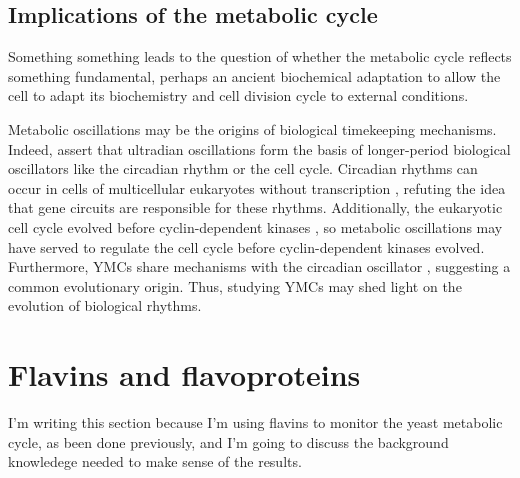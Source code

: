 \subsection{Implications of the metabolic cycle}
\label{subsec:intro-ymc-implications}



Something something leads to the question of whether the metabolic cycle reflects something fundamental, perhaps an ancient biochemical adaptation to allow the cell to adapt its biochemistry and cell division cycle to external conditions.

Metabolic oscillations may be the origins of biological timekeeping mechanisms.
Indeed, \citet{lloydRedoxRhythmicityClocks2007} assert that ultradian oscillations form the basis of longer-period biological oscillators like the circadian rhythm or the cell cycle. %
Circadian rhythms can occur in cells of multicellular eukaryotes without transcription \citep{oneillCircadianRhythmsPersist2011}, refuting the idea that gene circuits are responsible for these rhythms.
Additionally, the eukaryotic cell cycle evolved before cyclin-dependent kinases \citep{papagiannakisAutonomousMetabolicOscillations2017}, so metabolic oscillations may have served to regulate the cell cycle before cyclin-dependent kinases evolved.
Furthermore, YMCs share mechanisms with the circadian oscillator \citep{caustonMetabolicCyclesYeast2015,arataQuantitativeStudiesCellDivision2019}, suggesting a common evolutionary origin.
Thus, studying YMCs may shed light on the evolution of biological rhythms.

\section{Flavins and flavoproteins}
\label{sec:intro-flavin}
I'm writing this section because I'm using flavins to monitor the yeast metabolic cycle, as been done previously, and I'm going to discuss the background knowledege needed to make sense of the results.

